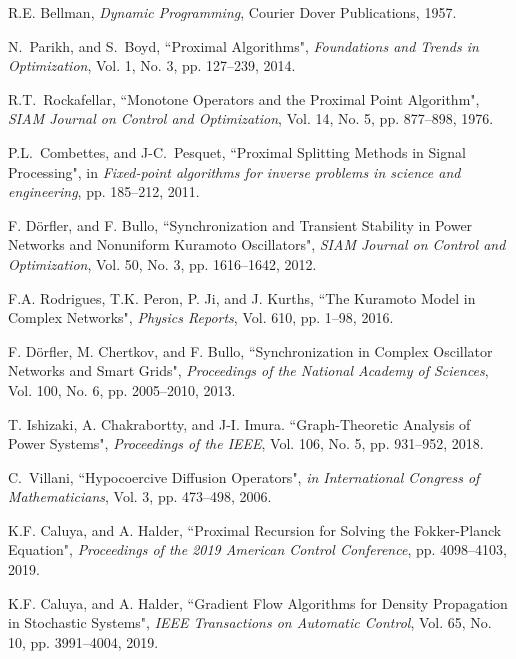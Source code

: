 \documentclass[10pt,twocolumn]{IEEEtran}
\begin{document}
\begin{thebibliography}{99}
R.E. Bellman, \emph{Dynamic Programming}, Courier Dover Publications, 1957.

N.~Parikh, and S.~Boyd, ``Proximal Algorithms", \emph{Foundations and Trends in Optimization}, Vol. 1, No. 3, pp. 127--239, 2014.

R.T.~Rockafellar, ``Monotone Operators and the Proximal Point Algorithm", \emph{SIAM Journal on Control and Optimization}, Vol. 14, No. 5, pp. 877--898, 1976.

P.L.~Combettes, and J-C.~Pesquet, ``Proximal Splitting Methods in Signal Processing", in \emph{Fixed-point algorithms for inverse problems in science and engineering}, pp. 185--212, 2011. 



F. D\"{o}rfler, and F. Bullo, ``Synchronization and Transient Stability in Power Networks and Nonuniform Kuramoto Oscillators", \emph{SIAM Journal on Control and Optimization}, Vol. 50, No. 3, pp. 1616--1642, 2012.

F.A. Rodrigues, T.K. Peron, P. Ji, and J. Kurths, ``The Kuramoto Model in Complex Networks", \emph{Physics Reports}, Vol. 610, pp. 1--98, 2016.

F. D{\"o}rfler, M. Chertkov, and F. Bullo, ``Synchronization in Complex Oscillator Networks and Smart Grids", \emph{Proceedings of the National Academy of Sciences}, Vol. 100, No. 6, pp. 2005--2010, 2013.

T. Ishizaki, A. Chakrabortty, and J-I. Imura. ``Graph-Theoretic Analysis of Power Systems", \emph{Proceedings of the IEEE}, Vol. 106, No. 5, pp. 931--952, 2018.

C.~Villani, ``Hypocoercive Diffusion Operators", \emph{in International Congress
of Mathematicians}, Vol. 3, pp. 473--498, 2006.


K.F. Caluya, and A. Halder, ``Proximal Recursion for Solving the Fokker-Planck Equation", \emph{Proceedings of the 2019 American Control Conference}, pp. 4098--4103, 2019.

K.F. Caluya, and A. Halder, ``Gradient Flow Algorithms for Density Propagation in Stochastic Systems", \emph{IEEE Transactions on Automatic Control}, Vol. 65, No. 10, pp. 3991--4004, 2019.


\end{thebibliography}
\end{document}
